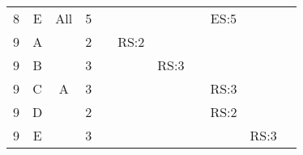 \documentclass[12pt]{article}
\begin{document}
\begin{table}[H]
\begin{tabular}{@{}c|c|c|c|ccccccc@{}}
8     & E    & All        & 5                                                      &                                                 &                                                 &                                                  &                                                  &  ES:5                                            &                                                  &                                                  \\ 
9     & A    &            & 2                                                      &                                                 &  RS:2                                           &                                                  &                                                  &                                                  &                                                  &                                                  \\ 
9     & B    &            & 3                                                      &                                                 &                                                 & RS:3                                             &                                                  &                                                  &                                                  &                                                  \\ 
9     & C    & A          & 3                                                      &                                                 &                                                 &                                                  &                                                  &  RS:3                                                &                                                  &                                                  \\ 
9     & D    &            & 2                                                      &                                                 &                                                 &                                                  &                                                  &  RS:2                                                 &                                                  &                                                  \\ 
9     & E    &            & 3                                                      &                                                 &                                                 &                                                  &                                                  &                                                  &  RS:3                                                &                                                  \\ \bottomrule
\end{tabular}
\end{table}
\end{document}

